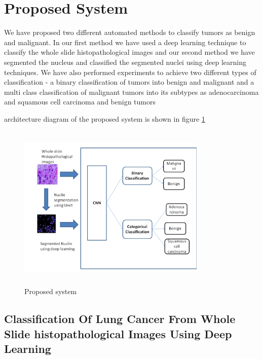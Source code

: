 \documentclass[conference]{IEEEtran}
\begin{document}
\section{Proposed System}
We have proposed two different automated methods to classify tumors as benign and malignant. In our first method we have used a deep learning technique to classify the whole slide histopathological images and our second method we have segmented the nucleus and classified the segmented nuclei using deep learning techniques. We have also performed experiments to achieve two different types of classification - a binary classification of tumors into benign and malignant and a multi class classification of malignant tumors into its subtypes as adenocarcinoma and squamous cell carcinoma and benign tumors

\The architecture diagram of the proposed system is shown in figure \ref{Proposed System}
\begin{figure}[htbp]
\centerline{\includegraphics[width=9cm, height=8cm]{./figures/paper_proposed_sys.png}}
\caption{Proposed system}
\label{Proposed System}
\end{figure}

\subsection{Classification Of Lung Cancer From Whole Slide histopathological Images Using Deep Learning}
\end{document}
